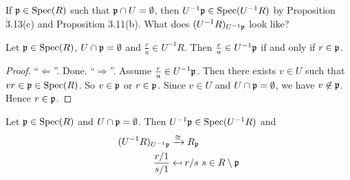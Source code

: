 \begin{question*}
    If $\mathfrak{p} \in \operatorname{Spec}(R)$ such that $\mathfrak{p} \cap U = \emptyset$, then $U^{-1}\mathfrak{p} \in \operatorname{Spec}(U^{-1}R)$ by Proposition 3.13(c) and Proposition 3.11(b). What does $(U^{-1}R)_{U^{-1}\mathfrak{p}}$ look like?
\end{question*}

\begin{lemma}
    Let $\mathfrak{p} \in \operatorname{Spec}(R)$, $U \cap \mathfrak{p} = \emptyset$ and $\frac{r}{u} \in U^{-1}R$. Then $\frac{r}{u} \in U^{-1}\mathfrak{p}$ if and only if $r \in \mathfrak{p}$. 
\end{lemma}

\begin{proof}
    ``$\Leftarrow$''. Done. ``$\Rightarrow$''. Assume $\frac{r}{u} \in U^{-1}\mathfrak{p}$. Then there exists $v \in U$ such that $vr \in \mathfrak{p} \in \operatorname{Spec}(R)$. So $v \in \mathfrak{p}$ or $r \in \mathfrak{p}$. Since $v \in U$ and $U \cap \mathfrak{p} = \emptyset$, we have $v \not \in \mathfrak{p}$. Hence $r \in \mathfrak{p}$.
\end{proof}

\begin{proposition}
    Let $\mathfrak{p} \in \operatorname{Spec}(R)$ and $U \cap \mathfrak{p} = \emptyset$. Then $U^{-1}\mathfrak{p} \in \operatorname{Spec}(U^{-1}R)$ and 
    \begin{align*}
        (U^{-1}R)_{U^{-1}\mathfrak{p}} &\xrightarrow \cong R_{\mathfrak{p}} \\
        \frac{r/1}{s/1} &\mapsfrom r/s \ s \in R \setminus \mathfrak{p} 
    \end{align*}
\end{proposition}

